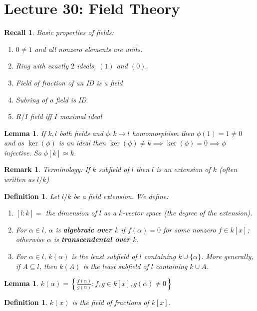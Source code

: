 \documentclass[a4paper,12pt]{article}
\newtheorem{lem}[thm]{Lemma}
\newtheorem{defn}[thm]{Definition}
\newtheorem{rmk}[thm]{Remark}
\newtheorem{rec}[thm]{Recall}
\begin{document}
\section{Lecture 30: Field Theory}
\begin{rec}
    Basic properties of fields:
    \begin{enumerate}
        \item $0\neq 1$ and all nonzero elements are units. 
        \item Ring with exactly $2$ ideals, $(1)$ and $(0)$. 
        \item Field of fraction of an ID is a field
        \item Subring of a field is ID
        \item $R/I$ field iff $I$ maximal ideal
    \end{enumerate}
\end{rec}
\begin{lem}
    If $k,l$ both fields and $\phi:k\to l$ homomorphism then $\phi(1)=1\neq 0$ and as $\ker(\phi)$ is an ideal then $\ker(\phi)\neq k\implies \ker(\phi)=0\implies \phi$ injective. So $\phi[k]\simeq k$. 
\end{lem}
\begin{rmk}
    Terminology: If $k$ subfield of $l$ then $l$ is an extension of $k$ (often written as $l/k$)
\end{rmk}
\begin{defn}
    Let $l/k$ be a field extension. We define:
    \begin{enumerate}
        \item $[l:k]=$ the dimension of $l$ as a $k$-vector space (the \emph{degree} of the extension).
        \item For $\alpha\in l$, $\alpha$ is \textbf{algebraic over $k$} if $f(\alpha)=0$ for some nonzero $f\in k[x]$; otherwise $\alpha$ is \textbf{transcendental over $k$}.
        \item For $\alpha\in l$, $k(\alpha)$ is the least subfield of $l$ containing $k\cup\{\alpha\}$. More generally, if $A\subseteq l$, then $k(A)$ is the least subfield of $l$ containing $k\cup A$.
    \end{enumerate}
\end{defn}
\begin{lem}
    $k(\alpha)= \left\{\frac{f(\alpha)}{g(\alpha)}: f,g\in k[x], g(\alpha)\neq 0\right\}$
\end{lem}
\begin{defn}
    $k(x)$ is the field of fractions of $k[x]$. 
\end{defn}
\end{document}
